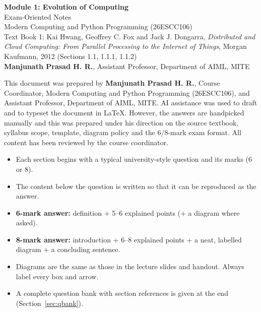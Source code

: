 \documentclass[11pt,a4paper]{article}
\begin{document}

\begin{center}
{\LARGE\bfseries Module 1: Evolution of Computing}\\[4pt]
{\large Exam-Oriented Notes}\\[4pt]
Modern Computing and Python Programming (26ESCC106)\\
Text Book 1: Kai Hwang, Geoffrey C. Fox and Jack J. Dongarra, \textit{Distributed and Cloud Computing: From Parallel Processing to the Internet of Things}, Morgan Kaufmann, 2012 (Sections 1.1, 1.1.1, 1.1.2)\\[6pt]
\textbf{Manjunath Prasad H. R.}, Assistant Professor, Department of AIML, MITE
\end{center}

\begin{tcolorbox}[colback=white,colframe=black,boxrule=0.5pt,arc=1pt,title={Note on Preparation},colbacktitle=black!12,coltitle=black,fonttitle=\bfseries]
\small This document was prepared by \textbf{Manjunath Prasad H. R.}, Course Coordinator, Modern Computing and Python Programming (26ESCC106), and Assistant Professor, Department of AIML, MITE. AI assistance was used to draft and to typeset the document in \LaTeX. However, the answers are handpicked manually and this was prepared under his direction on the source textbook, syllabus scope, template, diagram policy and the 6/8-mark exam format. All content has been reviewed by the course coordinator.
\end{tcolorbox}

\begin{tcolorbox}[colback=black!5,colframe=black,boxrule=0.5pt,arc=1pt,title={How to Use These Notes},colbacktitle=black!12,coltitle=black,fonttitle=\bfseries]
\begin{itemize}
\item Each section begins with a typical university-style question and its marks (6 or 8).
\item The content below the question is written so that it can be reproduced as the answer.
\item \textbf{6-mark answer:} definition + 5--6 explained points (+ a diagram where asked).
\item \textbf{8-mark answer:} introduction + 6--8 explained points + a neat, labelled diagram + a concluding sentence.
\item Diagrams are the same as those in the lecture slides and handout. Always label every box and arrow.
\item A complete question bank with section references is given at the end (Section~\ref{sec:qbank}).
\end{itemize}
\end{tcolorbox}
\clearpage
\tableofcontents
\clearpage
\end{document}
